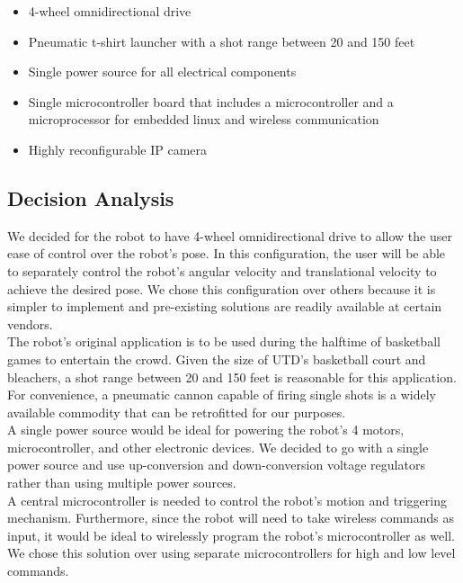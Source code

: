 \documentclass[letterpaper,12pt]{article}
\begin{document}
\begin{itemize}
    \item 4-wheel omnidirectional drive
    \item Pneumatic t-shirt launcher with a shot range between 20 and 150 feet
    \item Single power source for all electrical components
    \item Single microcontroller board that includes a microcontroller and
        a microprocessor for embedded linux and wireless communication
    \item Highly reconfigurable IP camera
\end{itemize}

\subsection{Decision Analysis}
\label{sec:decisionanalysis}
We decided for the robot to have 4-wheel omnidirectional drive to allow the
user ease of control over the robot's pose. In this configuration, the user
will be able to separately control the robot's angular velocity and
translational velocity to achieve the desired pose. We chose this configuration
over others because it is simpler to implement and pre-existing solutions are
readily available at certain vendors.\\

The robot's original application is to be used during the halftime of
basketball games to entertain the crowd. Given the size of UTD's basketball
court and bleachers, a shot range between 20 and 150 feet is reasonable for
this application. For convenience, a pneumatic cannon capable of firing single
shots is a widely available commodity that can be retrofitted for our purposes.\\

A single power source would be ideal for powering the robot's 4 motors,
microcontroller, and other electronic devices. We decided to go with a single
power source and use up-conversion and down-conversion voltage regulators
rather than using multiple power sources.\\

A central microcontroller is needed to control the robot's motion and
triggering mechanism. Furthermore, since the robot will need to take wireless
commands as input, it would be ideal to wirelessly program the robot's
microcontroller as well. We chose this solution over using separate
microcontrollers for high and low level commands.\\
\end{document}
